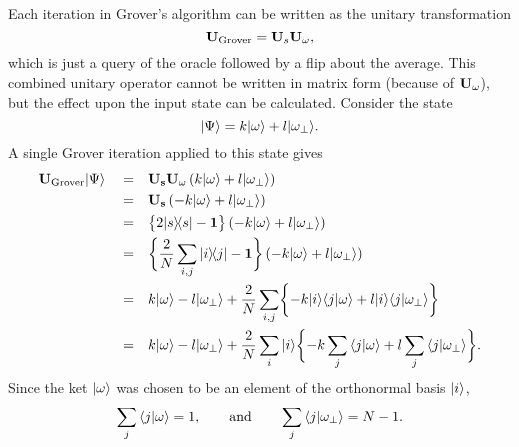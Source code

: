 Each iteration in Grover's algorithm can be written as
the unitary transformation
\begin{equation}
{\bf U}_{\text{Grover}} = {\bf U}_s {\bf U}_\omega,
\end{equation}
which is just a query of the oracle followed by a flip
about the average.
This combined unitary operator cannot be written in matrix
form (because of ${\bf U_\omega}$), but the effect upon
the input state can be calculated.
Consider the state
\begin{equation}
{|{\Psi}\rangle} = k{|{\omega}\rangle} + l{|{\omega_\perp}\rangle}.
\label{e:startGrover}
\end{equation}
A single Grover iteration applied to this state
gives
\begin{equation}
\begin{split}
{\bf U}_{\text{Grover}}{|{\Psi}\rangle}
\quad =&\quad  {\bf U_s}{\bf U_\omega} \left(
                k{|{\omega}\rangle} + l{|{\omega_\perp}\rangle}
             \right) \\
=&\quad  {\bf U_s} \left(
               -k{|{\omega}\rangle} + l{|{\omega_\perp}\rangle}
             \right) \\
=&\quad \bigl\lbrace 2{|{s}\rangle\!\langle{s}|} - {\bf 1} \bigr\rbrace
             \left(
                -k{|{\omega}\rangle} + l{|{\omega_\perp}\rangle}
             \right) \\
=&\quad \biggl\lbrace 
                    \frac{2}{N} \sum_{i,j}{|{i}\rangle\!\langle{j}|}
                    - {\bf 1} \biggr\rbrace
             \left(
                -k{|{\omega}\rangle} + l{|{\omega_\perp}\rangle}
             \right) \\
=&\quad 
                k{|{\omega}\rangle} - l{|{\omega_\perp}\rangle}
                + \frac{2}{N} \sum_{i,j} \biggl\lbrace
                                    - k{|{i}\rangle}{\langle{j}|{\omega}\rangle}
                                    + l{|{i}\rangle}{\langle{j}|{\omega_\perp}\rangle}
                              \biggr\rbrace \\
=&\quad 
                k{|{\omega}\rangle} - l{|{\omega_\perp}\rangle}
                + \frac{2}{N} \sum_i {|{i}\rangle} \biggl\lbrace
                                    - k\sum_j{\langle{j}|{\omega}\rangle}
                                    + l\sum_j{\langle{j}|{\omega_\perp}\rangle}
                              \biggr\rbrace.
\end{split}
\end{equation}
Since the ket ${|{\omega}\rangle}$ was chosen to be an element of the orthonormal
basis ${|{i}\rangle}$,
\begin{equation}
\sum_j {\langle{j}|{\omega}\rangle} = 1,\qquad\text{and}\qquad
\sum_j {\langle{j}|{\omega_\perp}\rangle} = N-1.
\end{equation}
